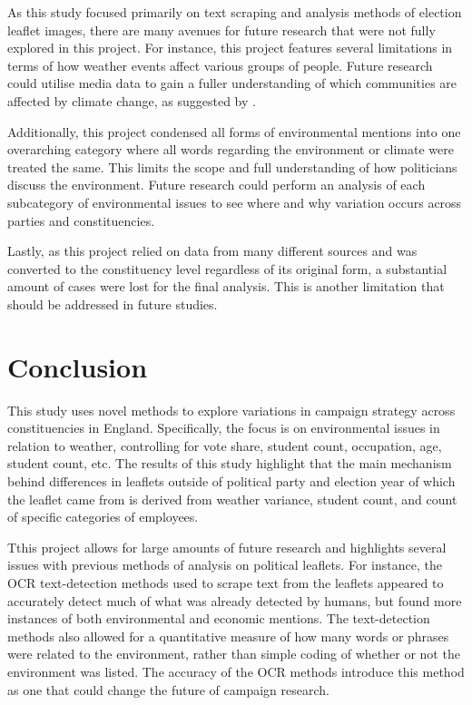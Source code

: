 \documentclass[preprint]{elsarticle} %
\begin{document}
As this study focused primarily on text scraping and analysis methods of election leaflet images, there are many avenues for future research that were not fully explored in this project. For instance, this project features several limitations in terms of how weather events affect various groups of people. Future research could utilise media data to gain a fuller understanding of which communities are affected by climate change, as suggested by \citet{siscoEffectsWeatherExperiences2021}. 

Additionally, this project condensed all forms of environmental mentions into one overarching category where all words regarding the environment or climate were treated the same. This limits the scope and full understanding of how politicians discuss the environment. Future research could perform an analysis of each subcategory of environmental issues to see where and why variation occurs across parties and constituencies.

Lastly, as this project relied on data from many different sources and was converted to the constituency level regardless of its original form, a substantial amount of cases were lost for the final analysis. This is another limitation that should be addressed in future studies.
	

\section{Conclusion}

This study uses novel methods to explore variations in campaign strategy across constituencies in England. Specifically, the focus is on environmental issues in relation to weather, controlling for vote share, student count, occupation, age, student count, etc. The results of this study highlight that the main mechanism behind differences in leaflets outside of political party and election year of which the leaflet came from is derived from weather variance, student count, and count of specific categories of employees.  


Tthis project allows for large amounts of future research and highlights several issues with previous methods of analysis on political leaflets. For instance, the OCR text-detection methods used to scrape text from the leaflets appeared to accurately detect much of what was already detected by humans, but found more instances of both environmental and economic mentions. The text-detection methods also allowed for a quantitative measure of how many words or phrases were related to the environment, rather than simple coding of whether or not the environment was listed. The accuracy of the OCR methods introduce this method as one that could change the future of campaign research.
\end{document}
